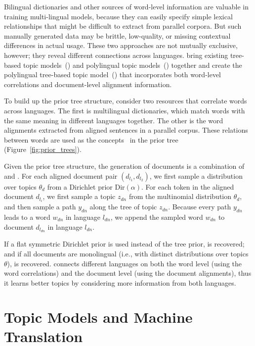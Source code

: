Bilingual dictionaries and other sources of word-level information are valuable in training multi-lingual models, because they can easily specify simple lexical relationships that might be difficult to extract from parallel corpora.
But such manually generated data may be brittle, low-quality, or missing contextual differences in actual usage.
These two approaches are not mutually exclusive, however; they reveal
different connections across languages. \citet{hu-14} bring existing
tree-based topic models~(\tlda{}) and polylingual topic
models~(\plda{}) together and create the polylingual tree-based topic
model~(\ptlda{}) that incorporates both word-level correlations and
document-level alignment information.

To build up the prior tree structure, \citet{hu-14} consider two
resources that correlate words across languages. The first is
multilingual dictionaries, which match words with the same meaning in
different languages together. The other is the word alignments
extracted from aligned sentences in a parallel corpus. These relations
between words are used as the concepts~\citep{Bhattacharya-2006} in
the prior tree (Figure~\ref{fig:prior_trees}).

Given the prior tree structure, the generation of documents is a
combination of \tlda{} and \plda{}.  For each aligned document pair
$(d_{l_1}, d_{l_2})$, we first sample a distribution over topics
$\theta_d$ from a Dirichlet prior $\text{Dir}(\alpha)$.  For each
token in the aligned document $d_{l_i}$, we first sample a topic
$z_{dn}$ from the multinomial distribution $\theta_d$, and then sample
a path $y_{dn}$ along the tree of topic $z_{dn}$. Because every path
$y_{dn}$ leads to a word $w_{dn}$ in language $l_{dn}$, we append the
sampled word $w_{dn}$ to document $d_{l_{dn}}$ in language $l_{dn}$.

If a flat symmetric Dirichlet prior is used instead of the tree prior,
\plda{} is recovered; and if all documents are monolingual (i.e., with
distinct distributions over topics $\theta$), \tlda{} is
recovered. \ptlda{} connects different languages on both the word
level (using the word correlations) and the document level (using the
document alignments), thus it learns better topics by considering more
information from both languages.


\section{Topic Models and Machine Translation}

